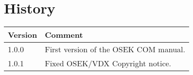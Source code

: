 \chapter{History}

\begin{tabular}{|p{}|p{}|}
\hline 
Version &
Comment
\tabularnewline
\hline
\hline 
1.0.0 &
First version of the OSEK COM manual.
\tabularnewline
\hline
1.0.1 &
Fixed OSEK/VDX Copyright notice.
\tabularnewline
\hline 
\end{tabular}
